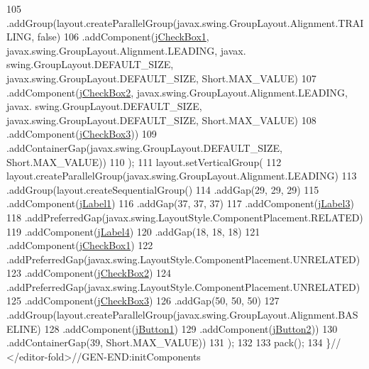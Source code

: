 \begin{DoxyCode}
105                 .addGroup(layout.createParallelGroup(javax.swing.GroupLayout.Alignment.TRAILING, \textcolor{keyword}{false})
106                     .addComponent(\mbox{\hyperlink{classsoftware_1_1_aceptar_peticiones_aaa4f8e7bc9bf52be8ee72e4baf0ccce6}{jCheckBox1}}, javax.swing.GroupLayout.Alignment.LEADING, javax.
      swing.GroupLayout.DEFAULT\_SIZE, javax.swing.GroupLayout.DEFAULT\_SIZE, Short.MAX\_VALUE)
107                     .addComponent(\mbox{\hyperlink{classsoftware_1_1_aceptar_peticiones_aedf3e1a05531ef046c98a870dfe5f898}{jCheckBox2}}, javax.swing.GroupLayout.Alignment.LEADING, javax.
      swing.GroupLayout.DEFAULT\_SIZE, javax.swing.GroupLayout.DEFAULT\_SIZE, Short.MAX\_VALUE)
108                     .addComponent(\mbox{\hyperlink{classsoftware_1_1_aceptar_peticiones_a7b914f4724640bc95273e5119651f9a7}{jCheckBox3}}))
109                 .addContainerGap(javax.swing.GroupLayout.DEFAULT\_SIZE, Short.MAX\_VALUE))
110         );
111         layout.setVerticalGroup(
112             layout.createParallelGroup(javax.swing.GroupLayout.Alignment.LEADING)
113             .addGroup(layout.createSequentialGroup()
114                 .addGap(29, 29, 29)
115                 .addComponent(\mbox{\hyperlink{classsoftware_1_1_aceptar_peticiones_a4678a7287858835aca98294897b6e05c}{jLabel1}})
116                 .addGap(37, 37, 37)
117                 .addComponent(\mbox{\hyperlink{classsoftware_1_1_aceptar_peticiones_af8e9b26223cf00481a430c6780ffef22}{jLabel3}})
118                 .addPreferredGap(javax.swing.LayoutStyle.ComponentPlacement.RELATED)
119                 .addComponent(\mbox{\hyperlink{classsoftware_1_1_aceptar_peticiones_ae9e89fa13ccf9f0b425175204554f58c}{jLabel4}})
120                 .addGap(18, 18, 18)
121                 .addComponent(\mbox{\hyperlink{classsoftware_1_1_aceptar_peticiones_aaa4f8e7bc9bf52be8ee72e4baf0ccce6}{jCheckBox1}})
122                 .addPreferredGap(javax.swing.LayoutStyle.ComponentPlacement.UNRELATED)
123                 .addComponent(\mbox{\hyperlink{classsoftware_1_1_aceptar_peticiones_aedf3e1a05531ef046c98a870dfe5f898}{jCheckBox2}})
124                 .addPreferredGap(javax.swing.LayoutStyle.ComponentPlacement.UNRELATED)
125                 .addComponent(\mbox{\hyperlink{classsoftware_1_1_aceptar_peticiones_a7b914f4724640bc95273e5119651f9a7}{jCheckBox3}})
126                 .addGap(50, 50, 50)
127                 .addGroup(layout.createParallelGroup(javax.swing.GroupLayout.Alignment.BASELINE)
128                     .addComponent(\mbox{\hyperlink{classsoftware_1_1_aceptar_peticiones_a0dbb46cb648a55e144e5334959c9a068}{jButton1}})
129                     .addComponent(\mbox{\hyperlink{classsoftware_1_1_aceptar_peticiones_ac78871be271223b0cf33bcee93b44687}{jButton2}}))
130                 .addContainerGap(39, Short.MAX\_VALUE))
131         );
132 
133         pack();
134     \}\textcolor{comment}{// </editor-fold>//GEN-END:initComponents}
\end{DoxyCode}
